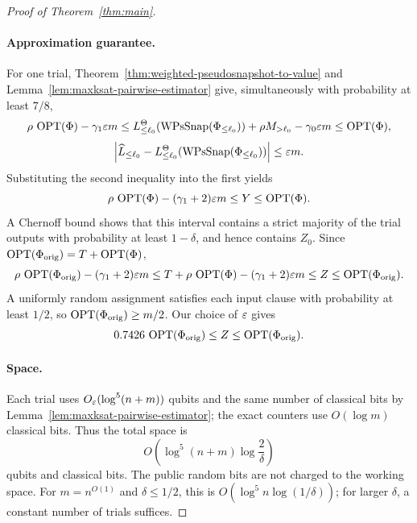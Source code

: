 \begin{proof}[Proof of Theorem~\ref{thm:main}]
\paragraph{Approximation guarantee.}
For one trial, Theorem~\ref{thm:weighted-pseudosnapshot-to-value} and Lemma~\ref{lem:maxksat-pairwise-estimator} give, simultaneously with probability at least $7/8$,
\[
  \rho\,\operatorname{OPT}(\Phi)-\gamma_1\varepsilon m
  \le L_{\le\ell_0}^\Theta(\operatorname{WPsSnap}(\Phi_{\le\ell_0}))
    +\rho M_{>\ell_0}-\gamma_0\varepsilon m
  \le\operatorname{OPT}(\Phi),
\]
\[
  \left|\widehat L_{\le\ell_0}
    -L_{\le\ell_0}^\Theta(\operatorname{WPsSnap}(\Phi_{\le\ell_0}))\right|\le\varepsilon m.
\]
Substituting the second inequality into the first yields
\[
  \rho\,\operatorname{OPT}(\Phi)-(\gamma_1+2)\varepsilon m\le Y\le\operatorname{OPT}(\Phi).
\]
A Chernoff bound shows that this interval contains a strict majority of the trial outputs with probability at least $1-\delta$, and hence contains $Z_0$.
Since $\operatorname{OPT}(\Phi_{\mathrm{orig}})=T+\operatorname{OPT}(\Phi)$,
\[
  \rho\,\operatorname{OPT}(\Phi_{\mathrm{orig}})-(\gamma_1+2)\varepsilon m
  \le T+\rho\,\operatorname{OPT}(\Phi)-(\gamma_1+2)\varepsilon m
  \le Z\le\operatorname{OPT}(\Phi_{\mathrm{orig}}).
\]
A uniformly random assignment satisfies each input clause with probability at least $1/2$, so $\operatorname{OPT}(\Phi_{\mathrm{orig}})\ge m/2$.
Our choice of $\varepsilon$ gives
\[
  0.7426\,\operatorname{OPT}(\Phi_{\mathrm{orig}})\le Z\le\operatorname{OPT}(\Phi_{\mathrm{orig}}).
\]

\paragraph{Space.}
Each trial uses $O_\varepsilon(\log^5(n+m))$ qubits and the same number of classical bits by Lemma~\ref{lem:maxksat-pairwise-estimator}; the exact counters use $O(\log m)$ classical bits.
Thus the total space is
\[
  O\!\left(\log^5(n+m)\log\frac2\delta\right)
\]
qubits and classical bits.
The public random bits are not charged to the working space.
For $m=n^{O(1)}$ and $\delta\le1/2$, this is $O(\log^5 n\log(1/\delta))$; for larger $\delta$, a constant number of trials suffices.
\end{proof}
